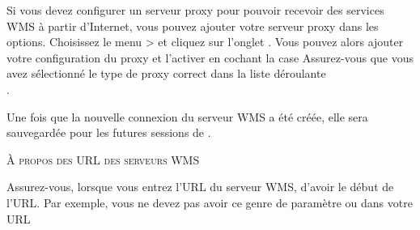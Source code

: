 Si vous devez configurer un serveur proxy pour pouvoir recevoir des services WMS à partir d'Internet, vous pouvez ajouter votre serveur proxy dans les options. Choisissez le menu  >  et cliquez sur l'onglet . Vous pouvez alors ajouter votre configuration du proxy et l'activer en cochant la case  Assurez-vous que vous avez sélectionné le type de proxy correct dans la liste  déroulante\\ .

Une fois que la nouvelle connexion du serveur WMS a été créée, elle sera sauvegardée pour les futures sessions de \qg.

\begin{Tip}[ht]\caption{\textsc{À propos des URL des serveurs WMS}}
Assurez-vous, lorsque vous entrez l'URL du serveur WMS, d'avoir le début de l'URL. Par exemple, vous ne devez pas avoir ce genre de paramètre   ou  dans votre URL
\end{Tip}



